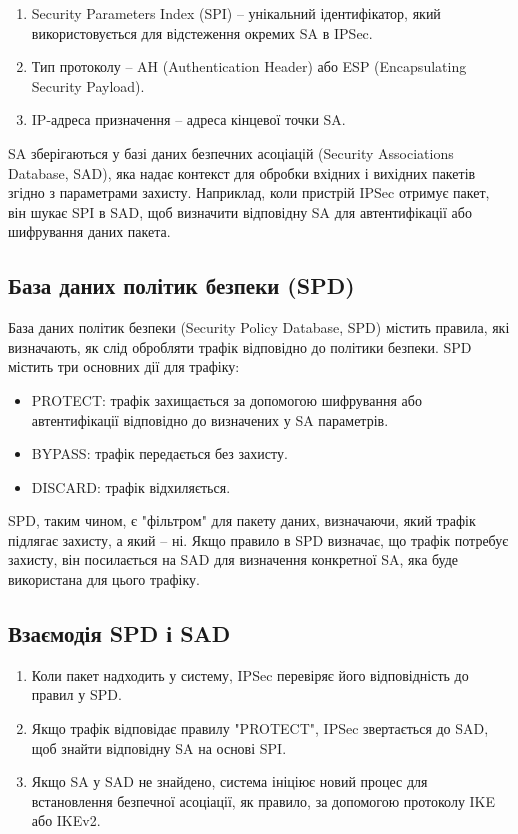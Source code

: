 \begin{enumerate}
    \item Security Parameters Index (SPI) – унікальний ідентифікатор, який використовується для відстеження окремих SA в IPSec.
    \item Тип протоколу – AH (Authentication Header) або ESP (Encapsulating Security Payload).
    \item IP-адреса призначення – адреса кінцевої точки SA.
\end{enumerate}

SA зберігаються у базі даних безпечних асоціацій (Security Associations Database, SAD), яка надає контекст для обробки вхідних і вихідних пакетів згідно з параметрами захисту. Наприклад, коли пристрій IPSec отримує пакет, він шукає SPI в SAD, щоб визначити відповідну SA для автентифікації або шифрування даних пакета.

\subsection{База даних політик безпеки (SPD)}

База даних політик безпеки (Security Policy Database, SPD) містить правила, які визначають, як слід обробляти трафік відповідно до політики безпеки. SPD містить три основних дії для трафіку:

\begin{itemize}
    \item PROTECT: трафік захищається за допомогою шифрування або автентифікації відповідно до визначених у SA параметрів.
    \item BYPASS: трафік передається без захисту.
    \item DISCARD: трафік відхиляється.
\end{itemize}

SPD, таким чином, є "фільтром" для пакету даних, визначаючи, який трафік підлягає захисту, а який – ні. Якщо правило в SPD визначає, що трафік потребує захисту, він посилається на SAD для визначення конкретної SA, яка буде використана для цього трафіку.

\subsection{Взаємодія SPD і SAD}

\begin{enumerate}
    \item Коли пакет надходить у систему, IPSec перевіряє його відповідність до правил у SPD.
    \item Якщо трафік відповідає правилу "PROTECT", IPSec звертається до SAD, щоб знайти відповідну SA на основі SPI.
    \item Якщо SA у SAD не знайдено, система ініціює новий процес для встановлення безпечної асоціації, як правило, за допомогою протоколу IKE або IKEv2.
\end{enumerate}

